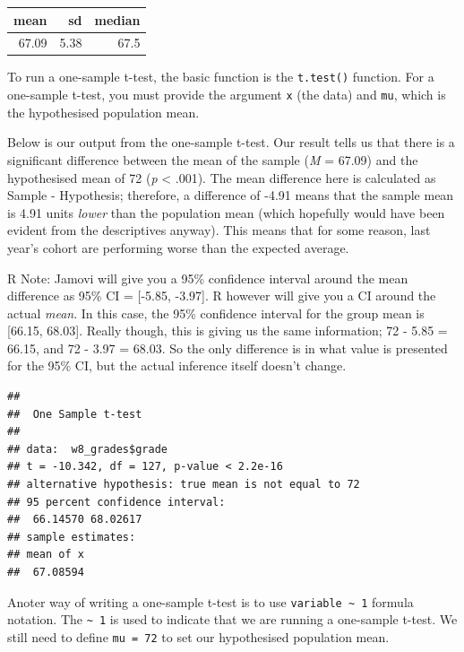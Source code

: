 \documentclass[
]{book}
\newenvironment{Shaded}{\begin{snugshade}}{\end{snugshade}}
\newcommand{\AttributeTok}[1]{\textcolor[rgb]{0.13,0.29,0.53}{#1}}
\newcommand{\DecValTok}[1]{\textcolor[rgb]{0.00,0.00,0.81}{#1}}
\newcommand{\FunctionTok}[1]{\textcolor[rgb]{0.13,0.29,0.53}{\textbf{#1}}}
\newcommand{\NormalTok}[1]{#1}
\newcommand{\SpecialCharTok}[1]{\textcolor[rgb]{0.81,0.36,0.00}{\textbf{#1}}}
\begin{document}
\begin{tabular}{r|r|r}
\hline
mean & sd & median\\
\hline
67.09 & 5.38 & 67.5\\
\hline
\end{tabular}

To run a one-sample t-test, the basic function is the \texttt{t.test()} function. For a one-sample t-test, you must provide the argument \texttt{x} (the data) and \texttt{mu}, which is the hypothesised population mean.

Below is our output from the one-sample t-test. Our result tells us that there is a significant difference between the mean of the sample (\emph{M} = 67.09) and the hypothesised mean of 72 (\emph{p} \textless{} .001). The mean difference here is calculated as Sample - Hypothesis; therefore, a difference of -4.91 means that the sample mean is 4.91 units \emph{lower} than the population mean (which hopefully would have been evident from the descriptives anyway). This means that for some reason, last year's cohort are performing worse than the expected average.

R Note: Jamovi will give you a 95\% confidence interval around the mean difference as 95\% CI = {[}-5.85, -3.97{]}. R however will give you a CI around the actual \emph{mean}. In this case, the 95\% confidence interval for the group mean is {[}66.15, 68.03{]}. Really though, this is giving us the same information; 72 - 5.85 = 66.15, and 72 - 3.97 = 68.03. So the only difference is in what value is presented for the 95\% CI, but the actual inference itself doesn't change.

\begin{Shaded}
\end{Shaded}

\begin{verbatim}
## 
##  One Sample t-test
## 
## data:  w8_grades$grade
## t = -10.342, df = 127, p-value < 2.2e-16
## alternative hypothesis: true mean is not equal to 72
## 95 percent confidence interval:
##  66.14570 68.02617
## sample estimates:
## mean of x 
##  67.08594
\end{verbatim}

Anoter way of writing a one-sample t-test is to use \texttt{variable\ \textasciitilde{}\ 1} formula notation. The \texttt{\textasciitilde{}\ 1} is used to indicate that we are running a one-sample t-test. We still need to define \texttt{mu\ =\ 72} to set our hypothesised population mean.
\end{document}
